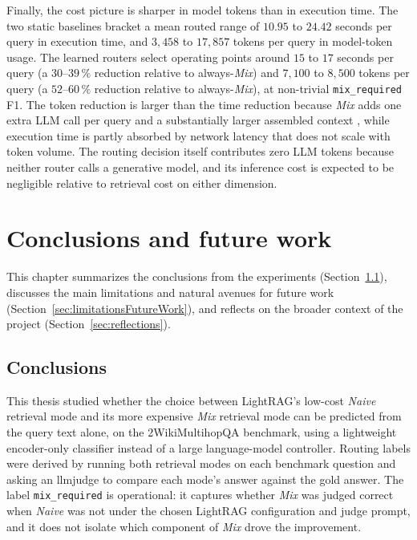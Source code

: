 \documentclass[english, bibtex]{kththesis}               %
\numberwithin{listing}{chapter}
\begin{document}
Finally, the cost picture is sharper in model tokens than in execution time. The two static baselines bracket a mean routed range of $10.95$ to $24.42$ seconds per query in execution time, and $3{,}458$ to $17{,}857$ tokens per query in model-token usage. The learned routers select operating points around $15$ to $17$ seconds per query (a $30$--$39\,\%$ reduction relative to always-\emph{Mix}) and $7{,}100$ to $8{,}500$ tokens per query (a $52$--$60\,\%$ reduction relative to always-\emph{Mix}), at non-trivial \texttt{mix\_required} F1. The token reduction is larger than the time reduction because \emph{Mix} adds one extra LLM call per query and a substantially larger assembled context \cite{lightrag2024,microsoft2024graphragcosts}, while execution time is partly absorbed by network latency that does not scale with token volume. The routing decision itself contributes zero LLM tokens because neither router calls a generative model, and its inference cost is expected to be negligible relative to retrieval cost on either dimension.

\cleardoublepage
\chapter{Conclusions and future work}
\label{ch:conclusionsAndFutureWork}

This chapter summarizes the conclusions from the experiments (Section~\ref{sec:conclusions}), discusses the main limitations and natural avenues for future work (Section~\ref{sec:limitationsFutureWork}), and reflects on the broader context of the project (Section~\ref{sec:reflections}).

\section{Conclusions}
\label{sec:conclusions}

This thesis studied whether the choice between LightRAG's low-cost \emph{Naive} retrieval mode and its more expensive \emph{Mix} retrieval mode can be predicted from the query text alone, on the 2WikiMultihopQA benchmark, using a lightweight encoder-only classifier instead of a large language-model controller. Routing labels were derived by running both retrieval modes on each benchmark question and asking an \gls{llmjudge} \cite{zheng2023judge} to compare each mode's answer against the gold answer. The label \texttt{mix\_required} is operational: it captures whether \emph{Mix} was judged correct when \emph{Naive} was not under the chosen LightRAG configuration and judge prompt, and it does not isolate which component of \emph{Mix} drove the improvement.
\end{document}
